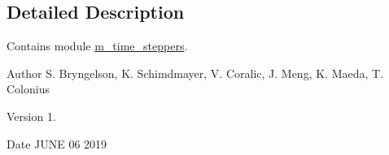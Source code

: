 \subsection{Detailed Description}
Contains module \hyperlink{namespacem__time__steppers}{m\+\_\+time\+\_\+steppers}. 

\begin{DoxyAuthor}{Author}
S. Bryngelson, K. Schimdmayer, V. Coralic, J. Meng, K. Maeda, T. Colonius 
\end{DoxyAuthor}
\begin{DoxyVersion}{Version}
1. 
\end{DoxyVersion}
\begin{DoxyDate}{Date}
J\+U\+NE 06 2019 
\end{DoxyDate}
